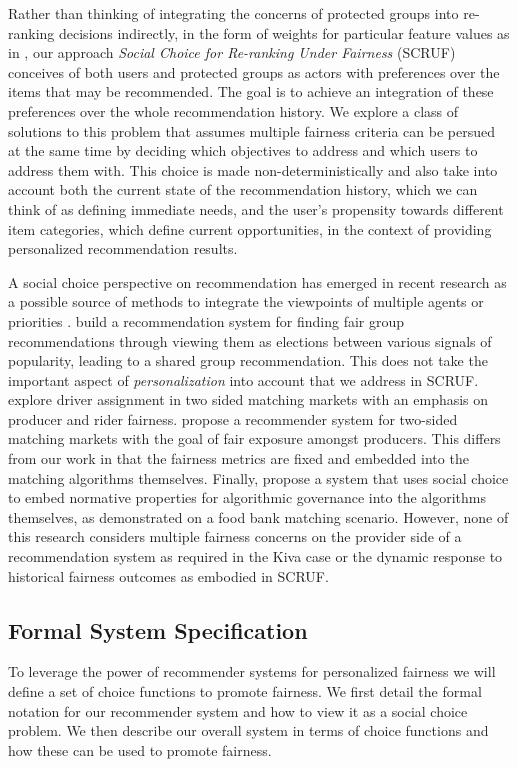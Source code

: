 Rather than thinking of integrating the concerns of protected groups into re-ranking decisions indirectly, in the form of weights for particular feature values as in \cite{sonboli-umap-2020}, our approach \textit{Social Choice for Re-ranking Under Fairness} (SCRUF) conceives of both users and protected groups as actors with preferences over the items that may be recommended. The goal is to achieve an integration of these preferences over the whole recommendation history. We explore a class of solutions to this problem that assumes multiple fairness criteria can be persued at the same time by deciding which objectives to address and which users to address them with.  This choice is made non-deterministically and also take into account both the current state of the recommendation history, which we can think of as defining immediate needs, and the user's propensity towards different item categories, which define current opportunities, in the context of providing personalized recommendation results. 

A social choice perspective on recommendation has emerged in recent research as a possible source of methods to integrate the viewpoints of multiple agents  or priorities \cite{burke2020algorithmic}. \citet{chakraborty2019equality} build a recommendation system for finding fair group recommendations through viewing them as elections between various signals of popularity, leading to a shared group recommendation.  This does not take the important aspect of \emph{personalization} into account that we address in SCRUF.  \citet{suhr2019two} explore driver assignment in two sided matching markets with an emphasis on producer and rider fairness. \citet{patro2020fairrec} propose a recommender system for two-sided matching markets with the goal of fair exposure amongst producers.  This differs from our work in that the fairness metrics are fixed and embedded into the matching algorithms themselves.  Finally, \citet{lee2019webuildai} propose a system that uses social choice to embed normative properties for algorithmic governance into the algorithms themselves, as demonstrated on a food bank matching scenario. However, none of this research considers multiple fairness concerns on the provider side of a recommendation system as required in the Kiva case or the dynamic response to historical fairness outcomes as embodied in SCRUF.


\subsection{\textbf{Formal System Specification}}
To leverage the power of recommender systems for personalized fairness we will define a set of choice functions to promote fairness. We first detail the formal notation for our recommender system and how to view it as a social choice problem. We then describe our overall system in terms of choice functions and how these can be used to promote fairness.

